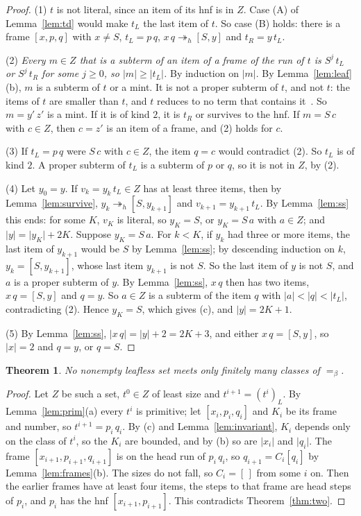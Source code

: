 \documentclass[11pt]{amsart}
\newtheorem{theorem}{Theorem}
\newcommand{\hred}{\twoheadrightarrow_h}
\newcommand{\conv}{=_\beta}
\newcommand{\sz}[1]{\lvert#1\rvert}
\newcommand{\fr}[1]{[#1]}
\begin{document}
\begin{proof}
(1) $t$ is not literal, since an item of its hnf is in $Z$. Case (A) of Lemma~\ref{lem:td} would
make $t_L$ the last item of $t$. So case (B) holds: there is a frame $\fr{x,p,q}$ with $x\ne S$,
$t_L=p\,q$, $x\,q\hred\fr{S,y}$ and $t_R=y\,t_L$.

(2) \emph{Every $m\in Z$ that is a subterm of an item of a frame of the run of $t$ is $S^j\,t_L$ or
$S^j\,t_R$ for some $j\ge0$, so $\sz m\ge\sz{t_L}$.} By induction on $\sz m$. By
Lemma~\ref{lem:leaf}(b), $m$ is a subterm of $t$ or a mint. It is not a proper subterm of $t$, and
not $t$: the items of $t$ are smaller than $t$, and $t$ reduces to no term that contains
it~\citep{s7}. So $m=y'\,z'$ is a mint. If it is of kind $2$, it is $t_R$ or survives to the hnf.
If $m=S\,c$ with $c\in Z$, then $c=z'$ is an item of a frame, and (2) holds for $c$.

(3) If $t_L=p\,q$ were $S\,c$ with $c\in Z$, the item $q=c$ would contradict (2). So $t_L$ is of
kind $2$. A proper subterm of $t_L$ is a subterm of $p$ or $q$, so it is not in $Z$, by (2).

(4) Let $y_0=y$. If $v_k=y_k\,t_L\in Z$ has at least three items, then by
Lemma~\ref{lem:survive}, $y_k\hred\fr{S,y_{k+1}}$ and $v_{k+1}=y_{k+1}\,t_L$. By Lemma~\ref{lem:ss}
this ends: for some $K$, $v_K$ is literal, so $y_K=S$, or $y_K=S\,a$ with $a\in Z$; and
$\sz y=\sz{y_K}+2K$. Suppose $y_K=S\,a$. For $k<K$, if $y_k$ had three or more items, the last item
of $y_{k+1}$ would be $S$ by Lemma~\ref{lem:ss}; by descending induction on $k$, $y_k=\fr{S,y_{k+1}}$,
whose last item $y_{k+1}$ is not $S$. So the last item of $y$ is not $S$, and $a$ is a proper
subterm of $y$. By Lemma~\ref{lem:ss}, $x\,q$ then has two items, $x\,q=\fr{S,y}$ and $q=y$. So
$a\in Z$ is a subterm of the item $q$ with $\sz a<\sz q<\sz{t_L}$, contradicting (2). Hence $y_K=S$, which
gives (c), and $\sz y=2K+1$.

(5) By Lemma~\ref{lem:ss}, $\sz{x\,q}=\sz y+2=2K+3$, and either $x\,q=\fr{S,y}$, so $\sz x=2$ and
$q=y$, or $q=S$.
\end{proof}

\begin{theorem}\label{thm:leafless}
No nonempty leafless set meets only finitely many classes of $\conv$.
\end{theorem}

\begin{proof}
Let $Z$ be such a set, $t^0\in Z$ of least size and $t^{i+1}=(t^i)_L$. By Lemma~\ref{lem:prim}(a) every
$t^i$ is primitive; let $\fr{x_i,p_i,q_i}$ and $K_i$ be its frame and number, so
$t^{i+1}=p_i\,q_i$. By (c) and Lemma~\ref{lem:invariant}, $K_i$ depends only on the class of $t^i$,
so the $K_i$ are bounded, and by (b) so are $\sz{x_i}$ and $\sz{q_i}$. The frame
$\fr{x_{i+1},p_{i+1},q_{i+1}}$ is on the head run of $p_i\,q_i$, so $q_{i+1}=C_i[q_i]$ by
Lemma~\ref{lem:frames}(b). The sizes do not fall, so $C_i=[\,]$ from some $i$ on. Then the earlier
frames have at least four items, the steps to that frame are head steps of $p_i$, and $p_i$ has
the hnf $\fr{x_{i+1},p_{i+1}}$. This contradicts Theorem~\ref{thm:two}.
\end{proof}
\end{document}
